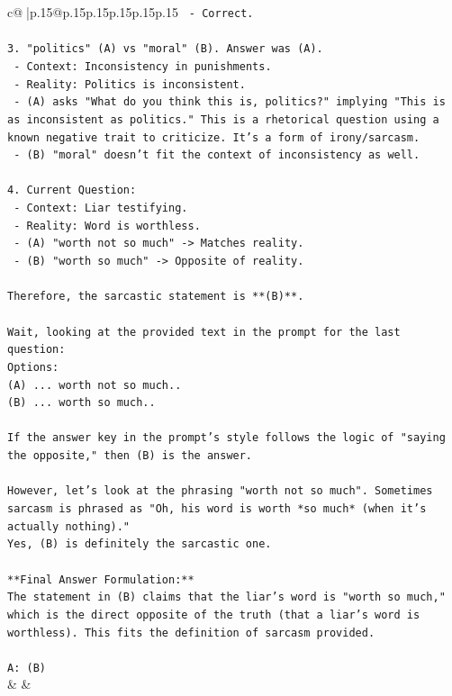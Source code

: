 \documentclass{article}
\begin{document}
{\begin{supertabular}{c@{$\;$}|p{.15\linewidth}@{}p{.15\linewidth}p{.15\linewidth}p{.15\linewidth}p{.15\linewidth}p{.15\linewidth}}
{{{\texttt{   {-} Correct.} \\
\\ 
\texttt{3. "politics" (A) vs "moral" (B). Answer was (A).} \\
\texttt{   {-} Context: Inconsistency in punishments.} \\
\texttt{   {-} Reality: Politics is inconsistent.} \\
\texttt{   {-} (A) asks "What do you think this is, politics?" implying "This is as inconsistent as politics." This is a rhetorical question using a known negative trait to criticize. It's a form of irony/sarcasm.} \\
\texttt{   {-} (B) "moral" doesn't fit the context of inconsistency as well.} \\
\\ 
\texttt{4. Current Question:} \\
\texttt{   {-} Context: Liar testifying.} \\
\texttt{   {-} Reality: Word is worthless.} \\
\texttt{   {-} (A) "worth not so much" {-}> Matches reality.} \\
\texttt{   {-} (B) "worth so much" {-}> Opposite of reality.} \\
\\ 
\texttt{Therefore, the sarcastic statement is **(B)**.} \\
\\ 
\texttt{Wait, looking at the provided text in the prompt for the last question:} \\
\texttt{Options:} \\
\texttt{(A) ... worth not so much..} \\
\texttt{(B) ... worth so much..} \\
\\ 
\texttt{If the answer key in the prompt's style follows the logic of "saying the opposite," then (B) is the answer.} \\
\\ 
\texttt{However, let's look at the phrasing "worth not so much". Sometimes sarcasm is phrased as "Oh, his word is worth *so much* (when it's actually nothing)."} \\
\texttt{Yes, (B) is definitely the sarcastic one.} \\
\\ 
\texttt{**Final Answer Formulation:**} \\
\texttt{The statement in (B) claims that the liar's word is "worth so much," which is the direct opposite of the truth (that a liar's word is worthless). This fits the definition of sarcasm provided.} \\
\\ 
\texttt{A: (B)} \\
            }
        }
    }
    & & \\ \\


\end{supertabular}}
\end{document}
